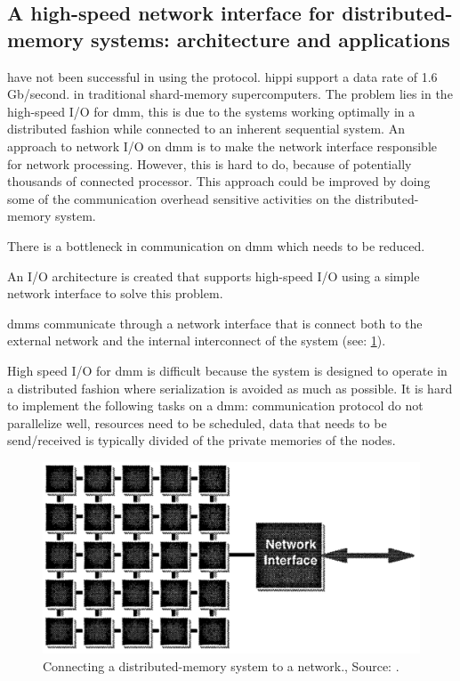 
\subsection{A high-speed network interface for distributed-memory systems: architecture and applications \cite{steenkiste1997high}} \label{ss:steenkiste1997high}

 have not been successful in using the  protocol.
\Ac{hippi} support a data rate of 1.6 Gb/second. in traditional shard-memory supercomputers.
The problem lies in the high-speed I/O for \ac{dmm}, this is due to the systems working optimally in a distributed fashion while connected to an inherent sequential system.
An approach to network I/O on \ac{dmm} is to make the network interface responsible for network processing.
However, this is hard to do, because of potentially thousands of connected processor.
This approach could be improved by doing some of the communication overhead sensitive activities on the distributed-memory system.

\motive
There is a bottleneck in communication on \acs{dmm} which needs to be reduced.

\objective
An I/O architecture is created that supports high-speed I/O using a simple network interface to solve this problem.

\summary
\Ac{dmm}s communicate through a network interface that is connect both to the external network and the internal interconnect of the system (see: \cref{fig:rep4:conndistrmem}).

High speed I/O for \ac{dmm} is difficult because the system is designed to operate in a distributed fashion where serialization is avoided as much as possible.
It is hard to implement the following tasks on a \ac{dmm}: communication protocol do not parallelize well, resources need to be scheduled, data that needs to be send/received is typically divided of the private memories of the  nodes.

\begin{figure}
	\centering
	\includegraphics[width=0.95\linewidth]{Figures/Rep4DistrMemSys.png}
	\caption{Connecting a distributed-memory system to a network., Source: \cite{steenkiste1997high}.} 
    \label{fig:rep4:conndistrmem}
\end{figure}

